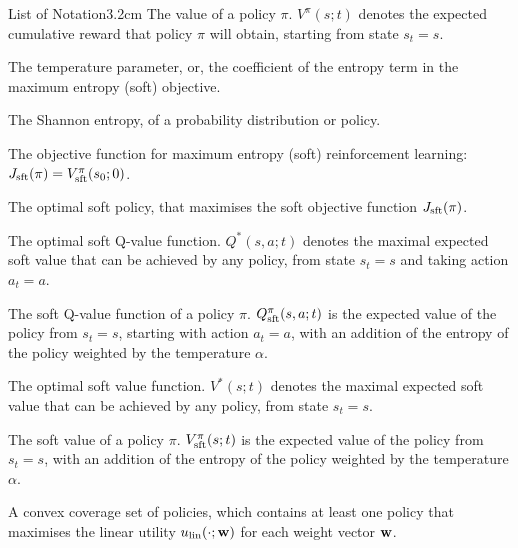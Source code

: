 \begin{mclistof}{List of Notation}{3.2cm}
        The value of a policy $\pi$. $V^{\pi}(s;t)$ denotes the expected cumulative reward that policy $\pi$ will obtain, starting from state $s_t=s$.
    \\
    \item[{\parbox[t]{\textwidth}{
        \Large\textbf{Maximum Entropy Reinforcement Learning \\(Section \ref{sec:2-3-1-merl})}\hfill\hfill
      }}]
    \item[$\alpha$] 
        The temperature parameter, or, the coefficient of the entropy term in the maximum entropy (soft) objective.
    \item[$\cl{H}$]
        The Shannon entropy, of a probability distribution or policy.
    \item[$J_{\sft}(\pi)$] 
        The objective function for maximum entropy (soft) reinforcement learning: $J_{{\textnormal{sft}}}(\pi) = V_{{\textnormal{sft}}}^{\pi}(s_0;0)$.
    \item[$\pi_{\sft}^*$]
        The optimal soft policy, that maximises the soft objective function $J_{\sft}(\pi)$.
    \item[$Q_{\sft}^*$]
        The optimal soft Q-value function. $Q^*(s,a;t)$ denotes the maximal expected soft value that can be achieved by any policy, from state $s_t=s$ and taking action $a_t=a$. 
    \item[$Q_{\sft}^{\pi}$]
        The soft Q-value function of a policy $\pi$. $Q_{{\textnormal{sft}}}^{\pi}(s,a;t)$ is the expected value of the policy from $s_t=s$, starting with action $a_t=a$, with an addition of the entropy of the policy weighted by the temperature $\alpha$.
    \item[$V_{\sft}^*$]
        The optimal soft value function. $V^*(s;t)$ denotes the maximal expected soft value that can be achieved by any policy, from state $s_t=s$. 
    \item[$V_{\sft}^{\pi}$]
        The soft value of a policy $\pi$. $V_{{\textnormal{sft}}}^{\pi}(s;t)$ is the expected value of the policy from $s_t=s$, with an addition of the entropy of the policy weighted by the temperature $\alpha$.
    \\
    \item[{\parbox[t]{\textwidth}{
        \Large\textbf{Multi-Objective Reinforcement Learning \\(Section \ref{sec:2-5-morl})}\hfill\hfill
      }}]
    \item[$CCS(\Pi)$] 
        A convex coverage set of policies, which contains at least one policy that maximises the linear utility $u_{{\textnormal{lin}}}(\cdot;\mathbf{w})$ for each weight vector $\mathbf{w}$.

\end{mclistof}
